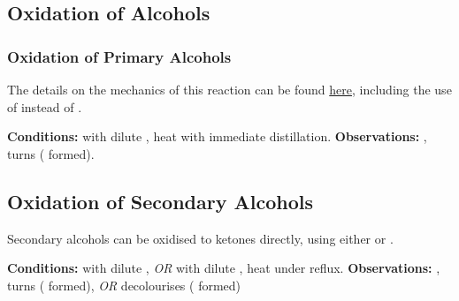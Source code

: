 		\subsection{Oxidation of Alcohols}

			\subsubsection{Oxidation of Primary Alcohols}

				The details on the mechanics of this reaction can be found \hyperlink{OxidationOfPrimaryAlcohols}{here}, including
				the use of  instead of .

				\vspace{1.5em}
				\vbox{\textbf{Conditions:}	\tabto{35mm} with dilute ,
											\tabto{35mm}heat with immediate distillation.}
				\vspace{0.75em}
				\vbox{\textbf{Observations:}\tabto{35mm} , turns 
														( formed).}



			\subsection{Oxidation of Secondary Alcohols}

				Secondary alcohols can be oxidised to ketones directly, using either  or .

				\vspace{1.5em}
				\vbox{\textbf{Conditions:}	\tabto{35mm} with dilute , \textit{OR}  with dilute ,
											\tabto{35mm}heat under reflux.}
				\vspace{0.75em}
				\vbox{\textbf{Observations:}\tabto{35mm} , turns 
														( formed), \textit{OR}
											\tabto{35mm}  decolourises ( formed)}


